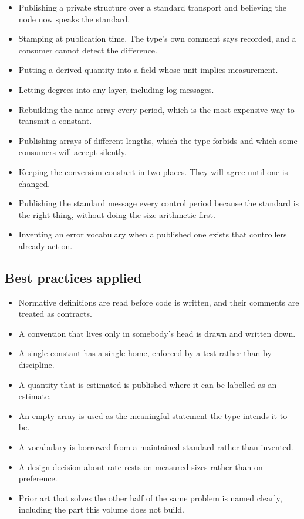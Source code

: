 \begin{itemize}
\item Publishing a private structure over a standard transport and believing the
node now speaks the standard.
\item Stamping at publication time. The type's own comment says recorded, and a
consumer cannot detect the difference.
\item Putting a derived quantity into a field whose unit implies measurement.
\item Letting degrees into any layer, including log messages.
\item Rebuilding the name array every period, which is the most expensive way to
transmit a constant.
\item Publishing arrays of different lengths, which the type forbids and which
some consumers will accept silently.
\item Keeping the conversion constant in two places. They will agree until one
is changed.
\item Publishing the standard message every control period because the standard
is the right thing, without doing the size arithmetic first.
\item Inventing an error vocabulary when a published one exists that controllers
already act on.
\end{itemize}

\subsection*{Best practices applied}

\begin{itemize}
\item Normative definitions are read before code is written, and their comments
are treated as contracts.
\item A convention that lives only in somebody's head is drawn and written down.
\item A single constant has a single home, enforced by a test rather than by
discipline.
\item A quantity that is estimated is published where it can be labelled as an
estimate.
\item An empty array is used as the meaningful statement the type intends it to
be.
\item A vocabulary is borrowed from a maintained standard rather than invented.
\item A design decision about rate rests on measured sizes rather than on
preference.
\item Prior art that solves the other half of the same problem is named clearly,
including the part this volume does not build.
\end{itemize}

